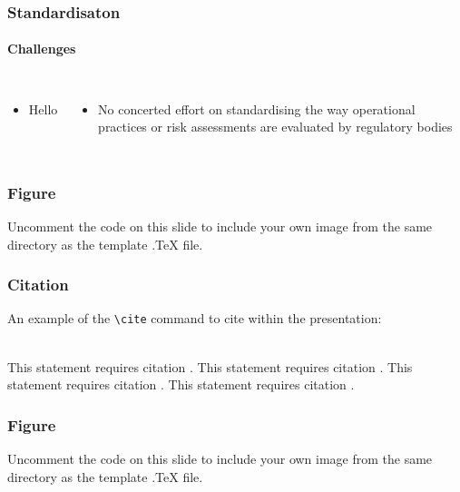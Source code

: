 \documentclass[usenames,dvipsnames,aspectratio=169,serif]{beamer}
\begin{document}
\begin{frame}[fragile] %
   \frametitle{Standardisaton}
   \framesubtitle{Challenges}
   \begin{columns}[t]
      \begin{itemize}
         \item Hello
      \end{itemize}
      \begin{itemize}
         \item No concerted effort on standardising the way operational practices or risk assessments are evaluated by regulatory bodies
      \end{itemize}
   \end{columns}
\end{frame}



\begin{frame}
   \frametitle{Figure}
   Uncomment the code on this slide to include your own image from the same directory as the template .TeX file.
\end{frame}


\begin{frame}[fragile] %
   \frametitle{Citation}
   An example of the \verb|\cite| command to cite within the presentation:\\~

   This statement requires citation \cite{FAA-ConOps-v2}.
   This statement requires citation \cite{EASA-UAS-ATM-Assessment-2018}.
   This statement requires citation \cite{RPASGM2020}.
   This statement requires citation \cite{FAA-NPRM-2019-1100}.
\end{frame}


\begin{frame}
   \frametitle{Figure}
   Uncomment the code on this slide to include your own image from the same directory as the template .TeX file.
\end{frame}
\end{document}
